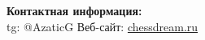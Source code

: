 \documentclass[a4paper,12pt]{article}
\begin{document}





\vspace{1cm}
\noindent\textbf{Контактная информация:} \\
tg: @AzaticG
Веб-сайт: \href{https://chessdream.ru}{chessdream.ru}
\end{document}

